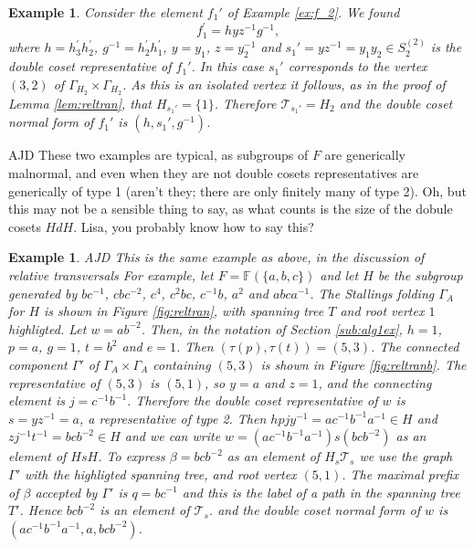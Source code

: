 \documentclass[a4paper,12pt]{article}
\renewcommand{\b}{\beta }
\newcommand{\G}{\Gamma }
\renewcommand{\t}{\tau }
\newtheorem{exam}[theorem]{Example}
\newenvironment{example}{\begin{exam} \rm}{\end{exam}}
\numberwithin{equation}{section}
\numberwithin{figure}{section}
\newcommand{\FF}{\ensuremath{\mathbb{F}}}
\newcommand{\cT}{\mathcal{T}}
\newenvironment{ajd1}{\noindent\color{red} AJD }{}
\newcommand{\ajd}[1]{\begin{ajd1} #1 \end{ajd1}}
\begin{document}
\begin{example}\label{ex:f_2_again}
Consider the element $f_1'$ of Example \ref{ex:f_2}. 
We found 
\[f_1^\prime=h yz^{-1} g^{-1},\]
where $h=h^\prime_3h_2^\prime$, $g^{-1}=h_2^\prime h_1^\prime$,  
$y=y_1$, $z=y_2^{-1}$ and $s_1'=yz^{-1}=y_1y_2\in S_2^{(2)}$ is the 
double coset representative of $f_1'$. In this case $s_1'$ corresponds
to the vertex $(3,2)$ of $\G_{H_2}\times \G_{H_2}$. As this is an 
isolated vertex it follows, as in the proof of Lemma \ref{lem:reltran},
that $H_{s_1'}=\{1\}$. Therefore $\cT_{s_1'}=H_2$ and the 
double coset normal form of $f_1'$ is 
$(h,s_1',g^{-1})$.  
\end{example}
\ajd{These two examples are typical, as subgroups of $F$ are generically
malnormal, and even when they are not 
double cosets representatives are generically of type 1 (aren't they; there
are only finitely many of type 2). Oh, but this may not be a sensible thing
to say, as what counts is the size of the dobule cosets $HdH$. Lisa,
you probably know how to say this?}
\begin{example}\label{ex:reltran}
\ajd{This is the same example as above, in the discussion of 
relative transversals} 
For example, let $F=\FF(\{a,b,c\})$ and let $H$ be the subgroup
 generated by $bc^{-1}$, $cbc^{-2}$, $c^4$, $c^2bc$, $c^{-1}b$, 
$a^2$ and $abca^{-1}$. The Stallings folding $\G_A$ for 
$H$ is shown in Figure \ref{fig:reltran}, with spanning tree
$T$ and root vertex $1$ highligted. Let $w=ab^{-2}$. Then, in 
the notation of Section \ref{sub:alg1ex}, $h=1$, $p=a$, $g=1$, $t=b^{2}$
and $e=1$. Then $(\t(p),\t(t))=(5,3)$. The connected component $\G'$ 
of $\G_A\times \G_A$ containing $(5,3)$ is shown in Figure 
\ref{fig:reltranb}. The representative of $(5,3)$ is 
$(5,1)$, so $y=a$ and $z=1$, and the  connecting element is  $j=c^{-1}b^{-1}$. 
Therefore the double coset representative of $w$ is $s=yz^{-1}=a$, a 
representative of type 2. 
Then $hpjy^{-1}=ac^{-1}b^{-1}a^{-1}\in H$ and $zj^{-1}t^{-1}=bcb^{-2}\in H$ and we 
can write $w=(ac^{-1}b^{-1}a^{-1})s(bcb^{-2})$ as an element of $HsH$.
To express $\b=bcb^{-2}$ as an element of $H_s\cT_s$ we use the
graph $\G'$ with the highligted spanning tree, and 
root vertex $(5,1)$. The maximal prefix of $\b$ accepted by 
$\G'$ is $q=bc^{-1}$ and this is the label of a path in the 
spanning tree $T'$. Hence $bcb^{-2}$ is an element of $\cT_s$. 
and 
 the double coset normal form of $w$ is $(ac^{-1}b^{-1}a^{-1}, a, 
bcb^{-2})$.
\end{example}
\end{document}
